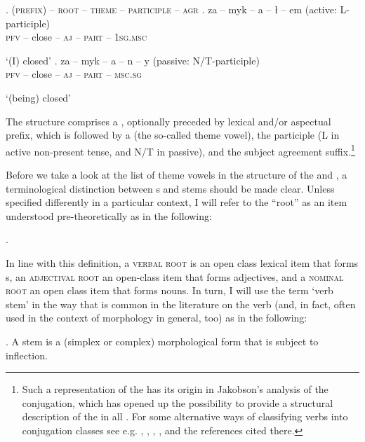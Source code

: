 \ex.\label{zamykac}
\textsc{(prefix) -- root -- theme -- participle -- agr}
\ag.
za -- myk -- a -- \l {} -- em (active: L-participle)\label{1a} \\
\textsc{pfv} -- close -- \textsc{aj} -- \textsc{part} -- \textsc{1sg.msc} \\
\strut `(I) closed' 
\bg. za -- myk -- a -- n -- y \hskip 0.15cm (passive: N/T-participle)\label{1b}\\
\textsc{pfv} -- close -- \textsc{aj} -- \textsc{part} -- \textsc{msc.sg} \\
\strut `(being) closed' 

The\largerpage {} structure comprises a , optionally preceded by lexical and/or aspectual prefix, which is followed by a  (the so-called theme vowel), the participle 
(L in active non-present tense, and N/T in passive), and the subject agreement suffix.\footnote{Such a  representation of the   has its origin in Jakobson's \citeyearpar{Jakobson1948} analysis of the  conjugation, which has opened up the possibility to provide a structural description of the  in all . For some alternative ways of classifying  verbs into conjugation classes see e.g. \cite{Laskowski1975}, \cite{towjand}, \cite{czayk1988}, \cite{Jablonska2007}, and the references cited there.
}%
\par
Before we take a look at the list of theme vowels in the structure of the  and  , a terminological distinction between s and stems should be made clear. Unless specified differently in a particular context, I will refer to the ``root'' as an item understood pre-theoretically as in the following:

\ex. 

In line with this definition, a \textsc{verbal root} is an open class lexical item that forms s, an \textsc{adjectival root} an open-class item that forms adjectives, and a \textsc{nominal root} an open class item that forms nouns. 
In turn, I will use the term `verb stem' in the way that is common in the literature on the  verb (and, in fact,  often used in the context of  morphology in general, too) as in the following:

\ex. A  stem is a (simplex or complex) morphological form that is subject to inflection. 

